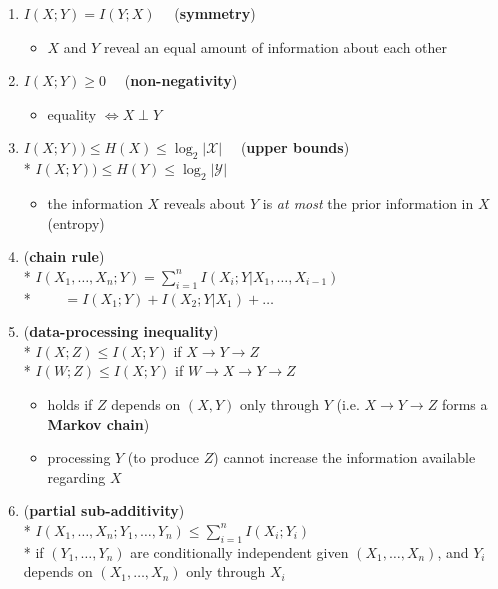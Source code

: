 \documentclass[10pt, landscape]{article}
\begin{document}
\begin{multicols*}{4}
  \begin{enumerate}
    \item $I(X; Y) = I(Y;X) \quad$ (\textbf{symmetry})
      \begin{itemize}
        \item $X$ and $Y$ reveal an equal amount of information about each other
      \end{itemize}
    \item $I(X;Y) \geq 0 \quad $ (\textbf{non-negativity})
      \begin{itemize}
        \item equality $\iff X \perp Y$
      \end{itemize}
    \item $I(X;Y)) \leq H(X) \leq \log_2 \vert \mathcal{X} \vert \quad$ (\textbf{upper bounds}) 
      \\* $I(X;Y)) \leq H(Y) \leq \log_2 \vert \mathcal{Y} \vert$
      \begin{itemize}
        \item the information $X$ reveals about $Y$ is \textit{at most} the prior information in $X$ (entropy)
      \end{itemize}
    \item (\textbf{chain rule}) 
      \\* \( {\displaystyle{ I(X_1, \dots, X_n;Y) = \sum^n_{i=1} I(X_i; Y \vert X_1, \dots, X_{i-1}) }} \) 
      \\* $ \quad\quad = I(X_1;Y) + I(X_2;Y \vert X_1) + \dots$
    \item (\textbf{data-processing inequality})
      \\* $I(X;Z) \leq I(X;Y)$ if $X \rightarrow Y \rightarrow Z$ $\quad$  
      \\* $I(W;Z) \leq I(X;Y)$ if $W \rightarrow X \rightarrow Y \rightarrow Z$ $\quad$  
      \begin{itemize}
        \item holds if $Z$ depends on $(X, Y)$ only through $Y$ (i.e. $X \rightarrow Y \rightarrow Z$ forms a \textbf{Markov chain})
        \item processing $Y$ (to produce $Z$)  cannot increase the information available regarding $X$
      \end{itemize}
    \item (\textbf{partial sub-additivity}) 
      \\*  \( {\displaystyle{ I(X_1, \dots, X_n; Y_1, \dots, Y_n) \leq \sum^n_{i=1} I(X_i;Y_i) }} \) 
      \\* if $(Y_1, \dots, Y_n)$ are conditionally independent given $(X_1, \dots, X_n)$, and $Y_i$ depends on $(X_1, \dots, X_n)$ only through $X_i$
  \end{enumerate}



\end{multicols*}
\end{document}
